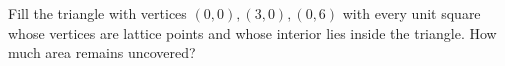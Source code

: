 Fill the triangle with vertices $(0,0),(3,0),(0,6)$ with every unit square whose vertices are lattice points and whose interior lies inside the triangle. How much area remains uncovered?
